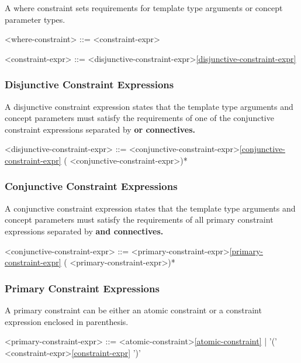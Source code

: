 \documentclass[a4paper,oneside,11pt]{article}
\begin{document}
A where constraint sets requirements for template type arguments or concept parameter types.

\begin{grammar}
\label{where-constraint}<where-constraint> ::=  <constraint-expr>

\label{constraint-expr}<constraint-expr> ::= <disjunctive-constraint-expr>\ref{disjunctive-constraint-expr}
\end{grammar}

\subsubsection{Disjunctive Constraint Expressions}

A disjunctive constraint expression states that the template type arguments and concept parameters must satisfy
the requirements of one of the conjunctive constraint expressions separated by \bf{or} connectives.

\begin{grammar}
\label{disjunctive-constraint-expr}<disjunctive-constraint-expr> ::= <conjunctive-constraint-expr>\ref{conjunctive-constraint-expr} ( <conjunctive-constraint-expr>)*
\end{grammar}

\subsubsection{Conjunctive Constraint Expressions}

A conjunctive constraint expression states that the template type arguments and concept parameters must satisfy
the requirements of all primary constraint expressions separated by \bf{and} connectives.

\begin{grammar}
\label{conjunctive-constraint-expr}<conjunctive-constraint-expr> ::= <primary-constraint-expr>\ref{primary-constraint-expr} ( <primary-constraint-expr>)*
\end{grammar}

\subsubsection{Primary Constraint Expressions}

A primary constraint can be either an atomic constraint or a constraint expression enclosed in parenthesis.

\begin{grammar}
\label{primary-constraint-expr}<primary-constraint-expr> ::= <atomic-constraint>\ref{atomic-constraint} | '(' <constraint-expr>\ref{constraint-expr} ')'
\end{grammar}
\end{document}
